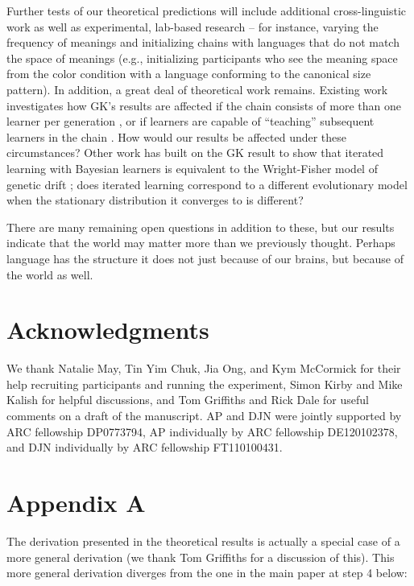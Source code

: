 \documentclass{apa}
\begin{document}
Further tests of our theoretical predictions will include additional cross-linguistic work as well as experimental, lab-based research -- for instance, varying the frequency of meanings and initializing chains with languages that do not match the space of meanings (e.g., initializing participants who see the meaning space from the {\sc color} condition with a language conforming to the canonical size pattern).
In addition, a great deal of theoretical work remains. Existing work investigates how GK's results are affected if the chain consists of more than one learner per generation \cite{smith09,burkettgriffiths10}, or if learners are capable of ``teaching'' subsequent learners in the chain \cite{beppugriffiths09}. How would our results be affected under these circumstances? Other work has built on the GK result to show that iterated learning with Bayesian learners is equivalent to the Wright-Fisher model of genetic drift \cite{realigriffiths09b}; does iterated learning correspond to a different evolutionary model when the stationary distribution it converges to is different?

There are many remaining open questions in addition to these, but our results indicate that the world may matter more than we previously thought. Perhaps language has the structure it does not just because of our brains, but because of the world as well.

\section{Acknowledgments}
We thank Natalie May, Tin Yim Chuk, Jia Ong, and Kym McCormick for their help recruiting participants and running the experiment, Simon Kirby and Mike Kalish for helpful discussions, and Tom Griffiths and Rick Dale for useful comments on a draft of the manuscript. AP and DJN were jointly supported by ARC fellowship DP0773794, AP individually by ARC fellowship DE120102378, and DJN individually by ARC fellowship FT110100431.

\section{Appendix A}

The derivation presented in the theoretical results is actually a special case of a more general derivation (we thank Tom Griffiths for a discussion of this).
This more general derivation diverges from the one in the main paper at step 4 below:
\end{document}
